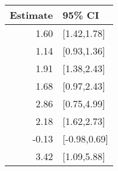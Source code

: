 \begin{tabular}{rl}
  \hline
Estimate & 95\% CI \\ 
  \hline
1.60 & [1.42,1.78] \\ 
  1.14 & [0.93,1.36] \\ 
  1.91 & [1.38,2.43] \\ 
  1.68 & [0.97,2.43] \\ 
  2.86 & [0.75,4.99] \\ 
  2.18 & [1.62,2.73] \\ 
  -0.13 & [-0.98,0.69] \\ 
  3.42 & [1.09,5.88] \\ 
   \hline
\end{tabular}

